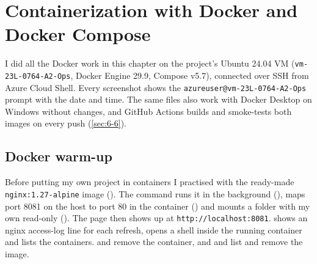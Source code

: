 \chapter{Containerization with Docker and Docker Compose}\label{ch:docker}

I did all the Docker work in this chapter on the project's Ubuntu 24.04 VM
(\texttt{vm-23L-0764-A2-Ops}, Docker Engine 29.9, Compose v5.7), connected over SSH from Azure Cloud
Shell. Every screenshot shows the \texttt{azureuser@vm-23L-0764-A2-Ops} prompt with the date and
time. The same files also work with Docker Desktop on Windows without changes, and GitHub Actions
builds and smoke-tests both images on every push (\cref{sec:6-6}).

\section{Docker warm-up}
Before putting my own project in containers I practised with the ready-made
\texttt{nginx:1.27-alpine} image (). The command
runs it in the background (), maps port 8081 on the host to port 80 in the container
() and mounts a folder with my own  read-only (). The page
then shows up at \texttt{http://localhost:8081}.  shows an nginx access-log line
for each refresh,  opens a shell inside the running container and
 lists the containers.  and  remove the
container, and  and  list and remove the image.


